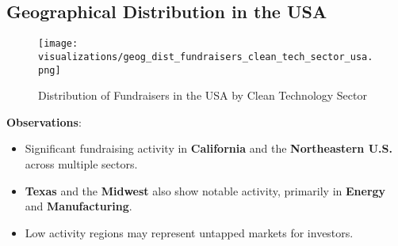 \documentclass[sigconf]{acmart}
\begin{document}
\subsection{Geographical Distribution in the USA}

\begin{figure*}[htpb]
    \centering
    \texttt{[image: visualizations/geog\_dist\_fundraisers\_clean\_tech\_sector\_usa.png]}
    \caption{Distribution of Fundraisers in the USA by Clean Technology Sector}
    \label{fig:usa_distribution}
\end{figure*}

\textbf{Observations}:

\begin{itemize}
    \item Significant fundraising activity in \textbf{California} and the \textbf{Northeastern U.S.} across multiple sectors.
    \item \textbf{Texas} and the \textbf{Midwest} also show notable activity, primarily in \textbf{Energy} and \textbf{Manufacturing}.
    \item Low activity regions may represent untapped markets for investors.
\end{itemize}
\end{document}
